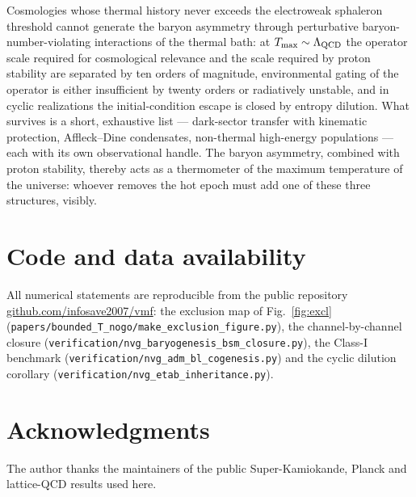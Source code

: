 \documentclass[12pt,a4paper]{article}
\begin{document}
Cosmologies whose thermal history never exceeds the electroweak
sphaleron threshold cannot generate the baryon asymmetry through
perturbative baryon-number-violating interactions of the thermal bath:
at $T_{\max}\sim\Lambda_{\rm QCD}$ the operator scale required for
cosmological relevance and the scale required by proton stability are
separated by ten orders of magnitude, environmental gating of the
operator is either insufficient by twenty orders or radiatively
unstable, and in cyclic realizations the initial-condition escape is
closed by entropy dilution.  What survives is a short, exhaustive list
--- dark-sector transfer with kinematic protection, Affleck--Dine
condensates, non-thermal high-energy populations --- each with its own
observational handle.  The baryon asymmetry, combined with proton
stability, thereby acts as a thermometer of the maximum temperature of
the universe: whoever removes the hot epoch must add one of these three
structures, visibly.

\section*{Code and data availability}

All numerical statements are reproducible from the public repository
\href{https://github.com/infosave2007/vmf}{github.com/infosave2007/vmf}:
the exclusion map of Fig.~\ref{fig:excl}
(\texttt{papers/bounded\_T\_nogo/make\_exclusion\_figure.py}), the
channel-by-channel closure
(\texttt{verification/nvg\_baryogenesis\_bsm\_closure.py}), the Class-I
benchmark (\texttt{verification/nvg\_adm\_bl\_cogenesis.py}) and the
cyclic dilution corollary
(\texttt{verification/nvg\_etab\_inheritance.py}).

\section*{Acknowledgments}
The author thanks the maintainers of the public Super-Kamiokande,
Planck and lattice-QCD results used here.
\end{document}
